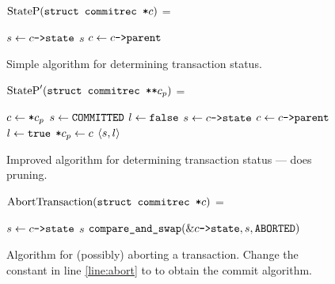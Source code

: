 \documentclass[11pt,notitlepage]{article}
\newcommand{\ptr}{\code{->}}
\newcommand{\codesize}{\scriptsize}
\begin{document}
\begin{figure}
$\text{StateP}(\texttt{struct commitrec *} c)$ =
\begin{myalgorithmic}
\LOOP
    \RETURN {}
  \ENDIF
  \STATE $s \gets c \ptr\code{state}$
    \RETURN $s$
  \ENDIF
  \STATE $c \gets c \ptr \code{parent}$
\ENDLOOP*
\end{myalgorithmic}
\caption{Simple algorithm for determining transaction status.}
\label{fig:statep}
\end{figure}

\begin{figure}
$\text{StateP}'(\texttt{struct commitrec **} c_p)$ =
\begin{myalgorithmic}
\STATE $c \gets \texttt{*}c_p$
\STATE $s \gets \texttt{COMMITTED}$
\STATE $l \gets \texttt{false}$
  \STATE $s \gets c\ptr\code{state}$ 
    \BREAK
  \ENDIF
  \STATE $c \gets c \ptr \code{parent}$
  \STATE $l \gets \texttt{true}$
\ENDWHILE
{}
  \STATE $\texttt{*}c_p \gets c$ 
\ENDIF
\RETURN $\left\langle s,l \right\rangle$
\end{myalgorithmic}
\caption{Improved algorithm for determining transaction status ---
         does pruning.}
\label{fig:statepprime}
\end{figure}

\begin{figure}
$\text{AbortTransaction}(\texttt{struct commitrec *} c)$ =
\begin{myalgorithmic}
  \RETURN {}
\ENDIF
\LOOP
  \STATE $s \gets c\ptr\code{state}$
    \RETURN $s$
  \ENDIF
  \STATE $\code{compare\_and\_swap}(\&c\ptr\code{state}, s, \code{ABORTED})$
         \label{line:abort}
\ENDLOOP*
\end{myalgorithmic}
\caption{Algorithm for (possibly) aborting a transaction.
         Change the constant  in line \ref{line:abort}
         to  to obtain the commit algorithm.}
\label{fig:aborttrans}
\end{figure}




\end{document}
